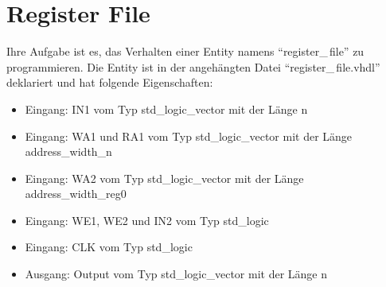 \documentclass[a4paper,12pt]{article}
\begin{document}
\pagestyle{empty}
\setlength{\parindent}{0em}
\section*{Register File}

Ihre Aufgabe ist es, das Verhalten einer Entity  namens "`register\_\,file"' zu programmieren. Die Entity ist in der angeh\"angten Datei "`register\_\,file.vhdl"' deklariert und hat folgende Eigenschaften:

\begin{itemize}
\item Eingang:  IN1 vom Typ std\_logic\_vector mit der L\"ange {{n}}
\item Eingang:  WA1 und RA1 vom Typ std\_logic\_vector mit der L\"ange {{address_width_n}}

\item Eingang:  WA2 vom Typ std\_logic\_vector mit der L\"ange {{address_width_reg0}}


\item Eingang:  WE1, WE2 und IN2 vom Typ std\_logic

\item Eingang:  CLK vom Typ std\_logic


\item Ausgang: Output vom Typ std\_logic\_vector mit der L\"ange {{n}}
\end{itemize}
\end{document}
